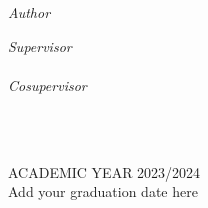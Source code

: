 \documentclass[
11pt, %
english, %
singlespacing, %
headsepline, %
]{MastersDoctoralThesis} %
\theoremstyle{plain}
\theoremstyle{definition}
\theoremstyle{remark}
\begin{document}
\begin{titlepage}
\begin{center}
		\begin{minipage}[t]{0.4\textwidth}
			\begin{flushleft} \large
				\emph{Author}\\
				\href{}{\authorname} %
			\end{flushleft}
		\end{minipage}
		\begin{minipage}[t]{0.4\textwidth}
			\begin{flushright} \large
				\emph{Supervisor} \\
				\href{}{\supname} \\ %
				\phantom{null}\newline 
				\emph{Cosupervisor} \\
				\href{}{\cosupname}
			\end{flushright}
		\end{minipage}\\[2cm]
		
		\vfill
		
		
		\vfill
		\HRule \\[1cm] %
		{\large ACADEMIC YEAR 2023/2024 \\ Add your graduation date here}\\[4cm] %
		
		\vfill
	\end{center}
\end{titlepage}

\cleardoublepage

\end{document}
